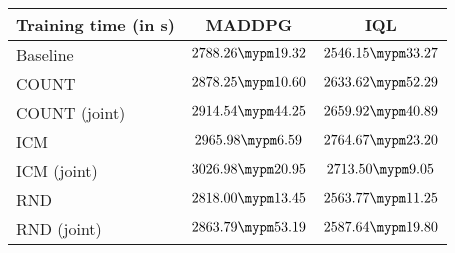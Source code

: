 \begin{tabular}{l | c c}
	Training time (in s) & MADDPG & IQL\\ \toprule
		Baseline & $2788.26 \mypm 19.32$ & $2546.15 \mypm 33.27$ \\ \midrule
	COUNT & $2878.25 \mypm 10.60$ & $2633.62 \mypm 52.29$ \\
	COUNT (joint) & $2914.54 \mypm 44.25$ & $2659.92 \mypm 40.89$ \\\midrule
	ICM & $2965.98 \mypm 6.59$ & $2764.67 \mypm 23.20$ \\
	ICM (joint) & $3026.98 \mypm 20.95$ & $2713.50 \mypm 9.05$ \\\midrule
	RND & $2818.00 \mypm 13.45$ & $2563.77 \mypm 11.25$ \\
	RND (joint) & $2863.79 \mypm 53.19$ & $2587.64 \mypm 19.80$ \\\midrule
\end{tabular}

